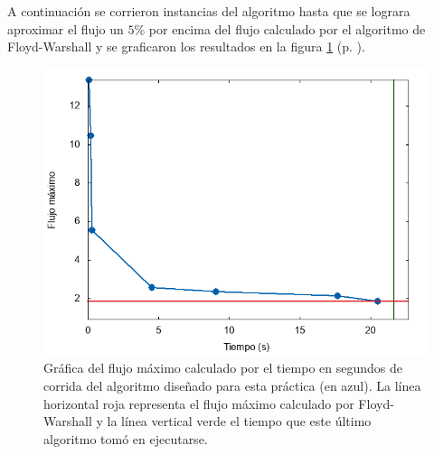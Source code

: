 \documentclass{article}
\begin{document}
  A continuación se corrieron instancias del algoritmo hasta que se lograra aproximar el flujo un $5$\% por encima del flujo calculado por el algoritmo de Floyd-Warshall y se graficaron los resultados en la figura \ref{flujo} (p. \pageref{flujo}).

  \begin{figure}[h]
    \includegraphics[width=1\textwidth]{flujo}
    \centering
    \caption{Gráfica del flujo máximo calculado por el tiempo en segundos de corrida del algoritmo diseñado para esta práctica (en azul). La línea horizontal roja representa el flujo máximo calculado por Floyd-Warshall y la línea vertical verde el tiempo que este último algoritmo tomó en ejecutarse.}
    \label{flujo}
  \end{figure}

  {}
  
\end{document}
